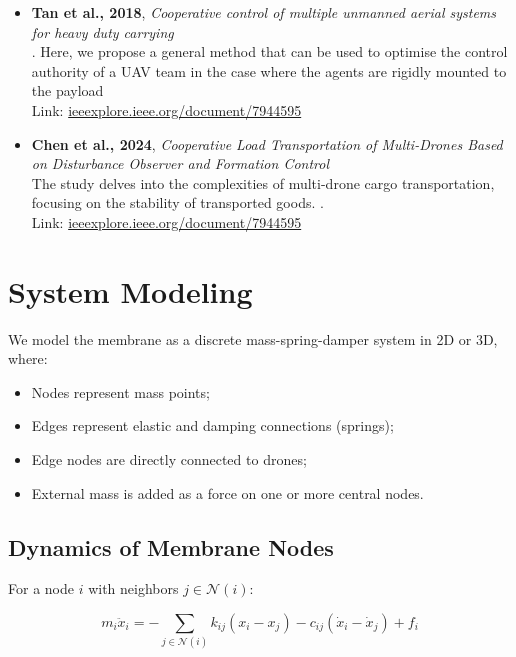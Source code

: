 \documentclass[11pt]{article}
\begin{document}
\begin{itemize}
     \item \textbf{Tan et al., 2018}, \emph{Cooperative control of multiple unmanned aerial systems for heavy duty carrying} \\
    . Here, we propose a general method that can be used to optimise the control authority of a UAV team in the case where the agents are rigidly mounted to the payload \\
    Link: \href{https://www.sciencedirect.com/science/article/abs/pii/S1367578818300221}{ieeexplore.ieee.org/document/7944595}
    
     \item \textbf{Chen et al., 2024}, \emph{Cooperative Load Transportation of Multi-Drones Based on Disturbance Observer and Formation Control} \\
   The study delves into the complexities of multi-drone cargo transportation, focusing on the stability of transported goods. . \\
    Link: \href{https://ieeexplore.ieee.org/document/10540584}{ieeexplore.ieee.org/document/7944595}
    
\end{itemize}

\section{System Modeling}

We model the membrane as a discrete mass-spring-damper system in 2D or 3D, where:

\begin{itemize}
    \item Nodes represent mass points;
    \item Edges represent elastic and damping connections (springs);
    \item Edge nodes are directly connected to drones;
    \item External mass is added as a force on one or more central nodes.
\end{itemize}

\subsection*{Dynamics of Membrane Nodes}
For a node $i$ with neighbors $j \in \mathcal{N}(i)$:

\begin{equation}
m_i \ddot{x}_i = -\sum_{j \in \mathcal{N}(i)} k_{ij}(x_i - x_j) - c_{ij}(\dot{x}_i - \dot{x}_j) + f_i
\end{equation}
\end{document}
